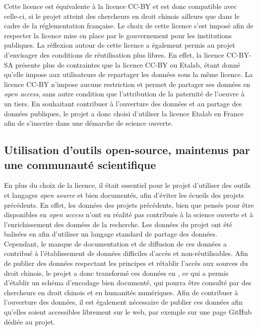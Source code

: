 Cette licence est équivalente à la licence CC-BY et est donc compatible avec celle-ci, si le projet \COREL atteint des chercheurs en droit chinois ailleurs que dans le cadre de la réglementation française. Le choix de cette licence s'est imposé afin de respecter la licence mise en place par le gouvernement pour les institutions publiques. La réflexion autour de cette licence a également permis au projet d'envisager des conditions de réutilisation plus libres. En effet, la licence CC-BY-SA présente plus de contraintes que la licence CC-BY ou Etalab, étant donné qu'elle impose aux utilisateurs de repartager les données sous la même licence. La licence CC-BY n'impose aucune restriction et permet de partager ses données en \textit{open access}, sans autre condition que l'attribution de la paternité de l'oeuvre à un tiers. En souhaitant contribuer à l'ouverture des données et au partage des données publiques, le projet \COREL a donc choisi d'utiliser la licence Etalab en France afin de s'inscrire dans une démarche de science ouverte. 

\subsection{Utilisation d’outils open-source, maintenus par une communauté scientifique}

En plus du choix de la licence, il était essentiel pour le projet d'utiliser des outils et langages \textit{open source} et bien documentés, afin d'éviter les écueils des projets précédents. En effet, les données des projets précédents, bien que pensés pour être disponibles en \textit{open access} n'ont en réalité pas contribués à la science ouverte et à l'enrichissement des données de la recherche. Les données du projet \LSC ont été balisées en \XML afin d'utiliser un langage standard de partage des données. Cependant, le manque de documentation et de diffusion de ces données a contribué à l'établissement de données difficiles d'accès et non-réutilisables. Afin de publier des données respectant les principes \fair et rétablir l'accès aux sources du droit chinois, le projet \COREL a donc transformé ces données en \TEI, ce qui a permis d'établir un schéma d'encodage bien documenté, qui pourra être consulté par des chercheurs en droit chinois et en humanités numériques. Afin de contribuer à l'ouverture des données, il est également nécessaire de publier ces données afin qu'elles soient accessibles librement sur le web, par exemple sur une page GitHub dédiée au projet.

